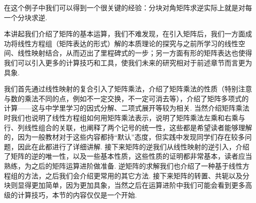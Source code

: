 在这个例子中我们可以得到一个很关键的经验：分块对角矩阵求逆实际上就是对每一个分块求逆.

\begin{summary}

    本讲起我们介绍了矩阵的基本运算，我们不难发现，在引入矩阵后，我们一方面成功将线性方程组（矩阵表达的形式）解的本质理论的探究与之前所学习的线性空间、线性映射结合，从而迈出了里程碑式的一步；另一方面有形的矩阵表达也使得我们可以引入更多的计算技巧和工具，使我们未来的研究相对于前述章节而言更为具象.

    我们首先通过线性映射的复合引入了矩阵乘法，介绍了矩阵乘法的性质（特别注意与数的乘法不同的点，例如不一定交换，不一定可消去等），介绍了矩阵多项式的计算——这与中学里学习的因式分解、二项式展开等较为相关. 当然介绍矩阵乘法时我们也说明了线性方程组如何用矩阵乘法表示，说明了矩阵乘法左乘和右乘与行、列线性组合的关联，也阐释了两个记号的统一性，这些都是希望读者能够理解的，因为一般教材对于这些内容都持``默认''态度，但实践中发现同学们存在较多问题，因此在此都进行了详细讲解. 接下来矩阵的逆我们从线性映射的逆引入，介绍了矩阵的逆的唯一性，以及一些基本性质，这些性质的证明都非常基本，读者应当熟练，为之后的矩阵运算进阶做准备. 逆矩阵的求解我们也介绍了一种基于线性方程组的方法，之后我们会介绍更常用的其它方法. 接下来矩阵的转置、共轭以及分块则显得更加简单，因为更加具象，当然之后在运算进阶中我们可能会看到更多高级的计算技巧，本节的内容仅仅是一个开始.

\end{summary}

